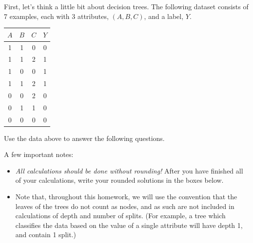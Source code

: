 \documentclass[11pt]{article}
\numberwithin{equation}{section} %
\numberwithin{figure}{section} %
\numberwithin{table}{section} %
\begin{document}
First, let's think a little bit about decision trees. The following dataset consists of 7 examples, each with 3 attributes, $(A,B,C)$, and a label, $Y$.

\begin{center}
\begin{tabular}{|c|c|c|c|}
\hline
$A$ & $B$ & $C$ & $Y$ \\ \hline
1 & 1 & 0 & 0     \\ \hline
1 & 1 & 2 & 1     \\ \hline
1 & 0 & 0 & 1     \\ \hline
1 & 1 & 2 & 1     \\ \hline
0 & 0 & 2 & 0     \\ \hline
0 & 1 & 1 & 0     \\ \hline
0 & 0 & 0 & 0     \\ \hline
\end{tabular}
\end{center}


Use the data above to answer the following questions. 

\begin{notebox}
A few important notes:
\begin{itemize}
    \item \emph{All calculations should be done without rounding!} After you have finished all of your calculations, write your rounded solutions in the boxes below.
    \item Note that, throughout this homework, we will use the convention that the leaves of the trees do not count as nodes, and as such are not included in calculations of depth and number of splits. (For example, a tree which classifies the data based on the value of a single attribute will have depth 1, and contain 1 split.)
\end{itemize}
\end{notebox}
\end{document}
